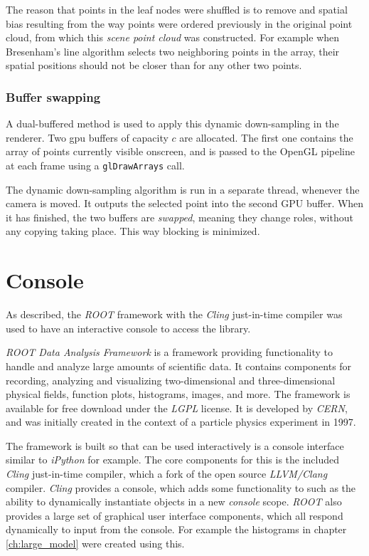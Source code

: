 The reason that points in the leaf nodes were shuffled is to remove and spatial bias resulting from the way points were ordered previously in the original point cloud, from which this \emph{scene point cloud} was constructed. For example when Bresenham's line algorithm selects two neighboring points in the array, their spatial positions should not be closer than for any other two points.

\subsubsection{Buffer swapping}
A dual-buffered method is used to apply this dynamic down-sampling in the renderer. Two \gls{gpu} buffers of capacity $c$ are allocated. The first one contains the array of points currently visible onscreen, and is passed to the OpenGL pipeline at each frame using a \verb&glDrawArrays& call.

The dynamic down-sampling algorithm is run in a separate thread, whenever the camera is moved. It outputs the selected point into the second \gls{GPU} buffer. When it has finished, the two buffers are \emph{swapped}, meaning they change roles, without any copying taking place. This way blocking is minimized.


\section{Console}
As described, the \emph{ROOT} framework with the \emph{Cling} just-in-time \cpp{} compiler was used to have an interactive console to access the library.

\emph{ROOT Data Analysis Framework} is a \cpp{} framework providing functionality to handle and analyze large amounts of scientific data. It contains components for recording, analyzing and visualizing two-dimensional and three-dimensional physical fields, function plots, histograms, images, and more. The framework is available for free download under the \emph{LGPL} license. It is developed by \emph{CERN}, and was initially created in the context of a particle physics experiment in 1997.

The framework is built so that \cpp{} can be used interactively is a console interface similar to \emph{iPython} for example. The core components for this is the included \emph{Cling} just-in-time compiler, which a fork of the open source \emph{LLVM/Clang} \cpp{} compiler. \emph{Cling} provides a console, which adds some functionality to \cpp{} such as the ability to dynamically instantiate objects in a new \emph{console} scope. \emph{ROOT} also provides a large set of graphical user interface components, which all respond dynamically to input from the console. For example the histograms in chapter \ref{ch:large_model} were created using this.

